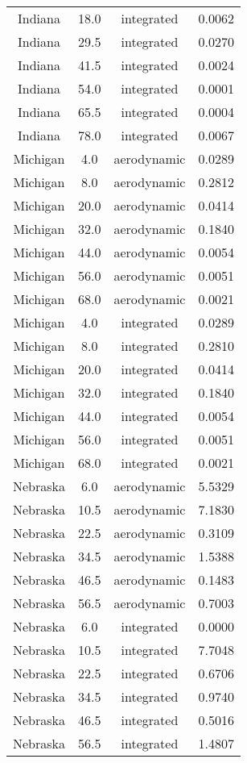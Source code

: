 \documentclass{article}
\begin{document}
\begin{longtable}[H]{cccc}
Indiana   & 18.0 & integrated & 0.0062 \\
Indiana   & 29.5 & integrated & 0.0270 \\
Indiana   & 41.5 & integrated & 0.0024 \\
Indiana   & 54.0 & integrated & 0.0001 \\
Indiana   & 65.5 & integrated & 0.0004 \\
Indiana   & 78.0 & integrated & 0.0067 \\
Michigan  & 4.0  & aerodynamic & 0.0289 \\
Michigan  & 8.0  & aerodynamic & 0.2812 \\
Michigan  & 20.0 & aerodynamic & 0.0414 \\
Michigan  & 32.0 & aerodynamic & 0.1840 \\
Michigan  & 44.0 & aerodynamic & 0.0054 \\
Michigan  & 56.0 & aerodynamic & 0.0051 \\
Michigan  & 68.0 & aerodynamic & 0.0021 \\
Michigan  & 4.0  & integrated & 0.0289 \\
Michigan  & 8.0  & integrated & 0.2810 \\
Michigan  & 20.0 & integrated & 0.0414 \\
Michigan  & 32.0 & integrated & 0.1840 \\
Michigan  & 44.0 & integrated & 0.0054 \\
Michigan  & 56.0 & integrated & 0.0051 \\
Michigan  & 68.0 & integrated & 0.0021 \\
Nebraska  & 6.0  & aerodynamic & 5.5329 \\
Nebraska  & 10.5 & aerodynamic & 7.1830 \\
Nebraska  & 22.5 & aerodynamic & 0.3109 \\
Nebraska  & 34.5 & aerodynamic & 1.5388 \\
Nebraska  & 46.5 & aerodynamic & 0.1483 \\
Nebraska  & 56.5 & aerodynamic & 0.7003 \\
Nebraska  & 6.0  & integrated & 0.0000 \\
Nebraska  & 10.5 & integrated & 7.7048 \\
Nebraska  & 22.5 & integrated & 0.6706 \\
Nebraska  & 34.5 & integrated & 0.9740 \\
Nebraska  & 46.5 & integrated & 0.5016 \\
Nebraska  & 56.5 & integrated & 1.4807 \\

\end{longtable}
\end{document}
